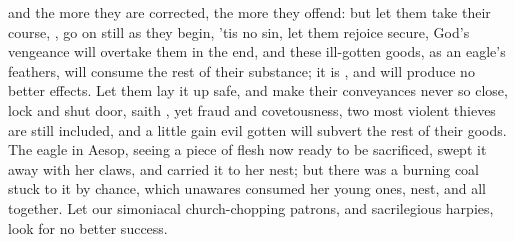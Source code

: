{{and the more they are corrected, the more they offend: but let them
take their course, , go on still as they begin,
'tis no sin, let them rejoice secure, God's vengeance will overtake
them in the end, and these ill-gotten goods, as an eagle's feathers,
 will consume the rest of their substance; it is , and will produce no better effects. Let them lay it
up safe, and make their conveyances never so close, lock and shut door,
saith \Chrysostom{}, yet fraud and covetousness, two most violent thieves
are still included, and a little gain evil gotten will subvert the rest
of their goods. The eagle in Aesop, seeing a piece of flesh now ready
to be sacrificed, swept it away with her claws, and carried it to her
nest; but there was a burning coal stuck to it by chance, which
unawares consumed her young ones, nest, and all together. Let our
simoniacal church-chopping patrons, and sacrilegious harpies, look for
no better success.

}}
